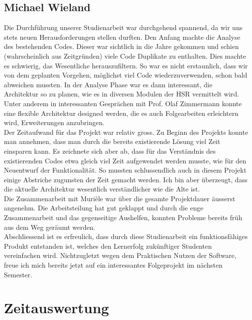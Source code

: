 \documentclass[11pt,a4paper,english,oneside]{book}
\numberwithin{equation}{chapter}
\begin{document}
	\section{Michael Wieland}
	Die Durchführung unserer Studienarbeit war durchgehend spannend, da wir uns stets neuen Herausforderungen stellen durften. Den Anfang machte die Analyse des bestehenden Codes. Dieser war sichtlich in die Jahre gekommen und schien (wahrscheinlich aus Zeitgründen) viele Code Duplikate zu enthalten. Dies machte es schwierig, das Wesentliche herauszufiltern. So war es nicht erstaunlich, dass wir von dem geplanten Vorgehen, möglichst viel Code wiederzuverwenden, schon bald abweichen mussten. In der Analyse Phase war es dann interessant, die Architektur so zu planen, wie es in diversen Modulen der HSR vermittelt wird. Unter anderem in interessanten Gesprächen mit Prof. Olaf Zimmermann konnte eine flexible Architektur designed werden, die es auch Folgearbeiten erleichtern wird, Erweiterungen anzubringen. \\
	
	\noindent
	Der Zeitaufwand für das Projekt war relativ gross. Zu Beginn des Projekts konnte man annehmen, dass man durch die bereits existierende Lösung viel Zeit einsparen kann. Es zeichnete sich aber ab, dass für das Verständnis des existierenden Codes etwa gleich viel Zeit aufgewendet werden musste, wie für den Neuentwurf der Funktionalität. So mussten schlussendlich auch in diesem Projekt einige Abstriche zugunsten der Zeit gemacht werden. Ich bin aber überzeugt, dass die aktuelle Architektur wesentlich verständlicher wie die Alte ist. \\
	
	\noindent
	Die Zusammenarbeit mit Murièle war über die gesamte Projektdauer äusserst angenehm. Die Arbeitsteilung hat gut geklappt und durch die enge Zusammenarbeit und das gegenseitige Aushelfen, konnten Probleme bereits früh aus dem Weg geräumt werden. \\
	
	\noindent
	Abschliessend ist es erfreulich, dass durch diese Studienarbeit ein funktionsfähiges Produkt entstanden ist, welches den Lernerfolg zukünftiger Studenten vereinfachen wird. Nichtzugletzt wegen dem Praktischen Nutzen der Software, freue ich mich bereits jetzt auf ein interessantes Folgeprojekt im nächsten Semester.
	
	\chapter{Zeitauswertung}	\label{zeitauswertung}
	
\end{document}
